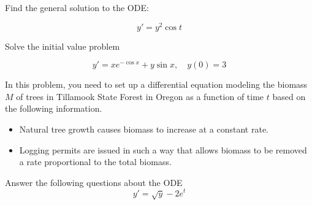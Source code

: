 \documentclass[addpoints,12pt]{exam}
\begin{document}
\newpage
\begin{questions}

\question[10] Find the general solution to the ODE:

$$y'=y^2\cos t$$
\newpage

\question[10] Solve the initial value problem

$$y'=xe^{-\cos x}+y\sin x,\quad y(0)=3$$

\newpage

\question[6] In this problem, you need to set up a differential equation modeling the biomass $M$ of trees in Tillamook State Forest in Oregon as a function of time $t$ based on the following information.
 \begin{itemize}
  \item Natural tree growth causes biomass to increase at a constant rate.
  \item Logging permits are issued in such a way that allows biomass to be removed a rate proportional to the total biomass.
 \end{itemize}
 
 
 \newpage

\question[8] Answer the following questions about the ODE
$$y'=\sqrt y - 2e^{t}$$

\end{questions}
\end{document}
